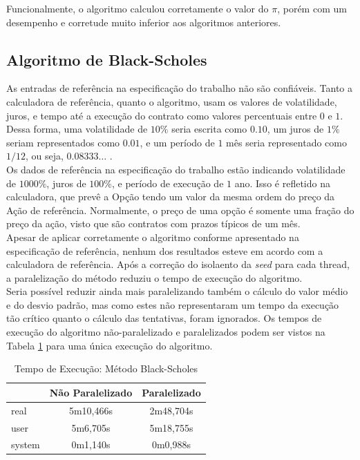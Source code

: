 \documentclass[12pt]{article}
\begin{document}
Funcionalmente, o algoritmo calculou corretamente o valor do $\pi$, porém com um desempenho
e corretude muito inferior aos algoritmos anteriores.\\

\subsection{Algoritmo de Black-Scholes}

As entradas de referência na especificação do trabalho não são confiáveis.
Tanto a calculadora de referência, quanto o algoritmo, usam os valores de volatilidade, juros,
e tempo até a execução do contrato como valores percentuais entre $0$ e $1$. Dessa forma, uma
volatilidade de $10\%$ seria escrita como $0.10$, um juros de $1\%$ seriam representados como
$0.01$, e um período de $1$ mês seria representado como $1/12$, ou seja, $0.08333\dots$ .\\

Os dados de referência na especificação do trabalho estão indicando volatilidade de
$1000\%$, juros de $100\%$, e período de execução de $1$ ano.
Isso é refletido na calculadora, que prevê a Opção tendo um valor da mesma ordem do preço da
Ação de referência. Normalmente, o preço de uma opção é somente uma fração do preço da ação,
visto que são contratos com prazos típicos de um mês.\\

Apesar de aplicar corretamente o algoritmo conforme apresentado na especificação de referência,
nenhum dos resultados esteve em acordo com a calculadora de referência. Após a correção do
isolaento da \textit{seed} para cada thread, a paralelização do método reduziu o tempo de
execução do algoritmo.\\

Seria possível reduzir ainda mais paralelizando também o cálculo do valor médio e do desvio
padrão, mas como estes não representaram um tempo da execução tão crítico quanto o cálculo das
tentativas, foram ignorados. Os tempos de execução do algoritmo não-paralelizado e paralelizados
podem ser vistos na Tabela \ref{tab:table05} para uma única execução do algoritmo. 

\begin{table}[h]
	\centering
	\caption{Tempo de Execução: Método Black-Scholes}
	\begin{tabular}{|l|c|c|}
		\hline
		{}			& Não Paralelizado & Paralelizado \\
		\hline
		real 		& 5m10,466s	& 2m48,704s \\
		user 		& 5m6,705s	& 5m18,755s \\
		system		& 0m1,140s	& 0m0,988s \\
		\hline
	\end{tabular}
	\label{tab:table05}
\end{table}
\end{document}
